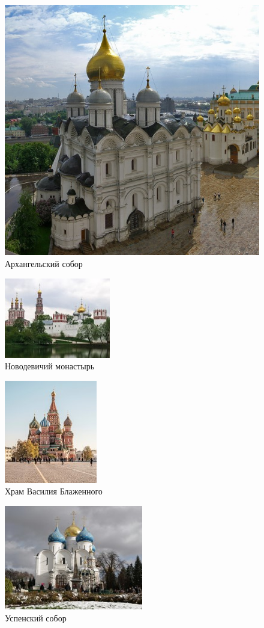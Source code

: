 \begin{figure}[ht]
    \centering
    \includegraphics{img/rus/7.jpg}
    \caption{Архангельский собор }\label{fig:rus:7}
\end{figure}

\begin{figure}[ht]
    \centering
    \includegraphics{img/rus/8.jpg}
    \caption{Новодевичий монастырь}\label{fig:rus:8}
\end{figure}

\begin{figure}[ht]
    \centering
    \includegraphics{img/rus/9.jpg}
    \caption{Храм Василия Блаженного}\label{fig:rus:9}
\end{figure}

\begin{figure}[ht]
    \centering
    \includegraphics{img/rus/10.jpg}
    \caption{Успенский собор}\label{fig:rus:10}
\end{figure}